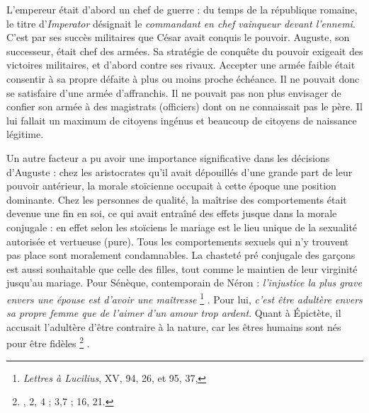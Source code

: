  L'empereur était d'abord un chef de guerre : du temps de la république romaine, le titre d'\emph{Imperator} désignait le {\emph{commandant en chef vainqueur devant l'ennemi}}. C'est par ses succès militaires que César avait conquis le pouvoir. Auguste, son successeur, était chef des armées. Sa stratégie de conquête du pouvoir exigeait des victoires militaires, et d'abord contre ses rivaux. Accepter une armée faible était consentir à sa propre défaite à plus ou moins proche échéance. Il ne pouvait donc se satisfaire d'une armée d'affranchis. Il ne pouvait pas non plus envisager de confier son armée à des magistrats (officiers) dont on ne connaissait pas le père. Il lui fallait un maximum de citoyens ingénus et beaucoup de citoyens de naissance légitime. 

 Un autre facteur a pu avoir une importance significative dans les décisions d'Auguste : chez les aristocrates qu'il avait dépouillés d'une grande part de leur pouvoir antérieur, la morale stoïcienne occupait à cette époque une position dominante. Chez les personnes de qualité, la maîtrise des comportements était devenue une fin en soi, ce qui avait entraîné des effets jusque dans la morale conjugale : en effet selon les stoïciens le mariage est le lieu unique de la sexualité autorisée et vertueuse (pure). Tous les comportements sexuels qui n'y trouvent pas place sont moralement condamnables. La chasteté pré conjugale des garçons est aussi souhaitable que celle des filles, tout comme le maintien de leur virginité jusqu'au mariage. Pour Sénèque, contemporain de Néron : {\emph{l'injustice la plus grave envers une épouse est d'avoir une maîtresse}%
\footnote{\emph{Lettres à Lucilius}, XV, 94, 26, et 95, 37, }%
}. Pour lui, {\emph{c'est être adultère envers sa propre femme que de l'aimer d'un amour trop ardent}}. Quant à Épictète, il accusait l'adultère d'être contraire à la nature, car les êtres humains sont nés pour être fidèles%
\footnote{, 2, 4 ; 3,7 ; 16, 21.}%
. 

